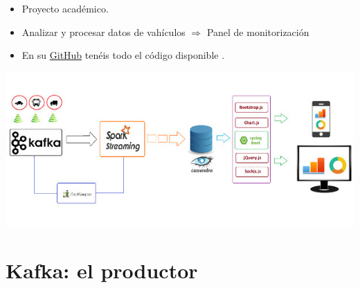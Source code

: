 \documentclass[dvipsnames]{beamer}
\begin{document}
        \begin{frame}
          \begin{itemize}
          \item Proyecto académico.
          \item Analizar y procesar datos de vahículos $\Rightarrow$ Panel de monitorización
          \item En su \href{https://github.com/baghelamit/iot-traffic-monitor}{\textcolor{deepBlue}{GitHub}} tenéis todo el código disponible \Winkey.
          \end{itemize}
        \end{frame}

        \begin{frame}
          \begin{center}
          \includegraphics[scale=0.5]{img/arquitectura.jpg}  
          \end{center}          
        \end{frame}

        \section{Kafka: el productor}
	
\end{document}
